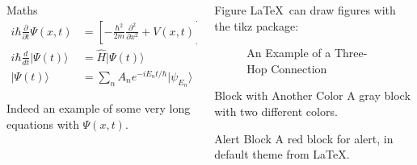 \documentclass{purdue-poster}
\begin{document}
\begin{frame}{}
\begin{columns}[c]
\begin{column}{.48\linewidth}
\begin{block}{Maths}
        \begin{align}
        i\hbar {\frac {\partial }{\partial t}}\Psi (x,t)&=\left[-{\frac {\hbar ^{2}}{2m}}{\frac {\partial ^{2}}{\partial x^{2}}}+V(x,t)\right]\Psi (x,t) \\
        i\hbar {\frac {d}{dt}}\vert \Psi (t)\rangle &={\hat {H}}\vert \Psi (t)\rangle \\ 
        |\Psi (t)\rangle &=\sum _{n}A_{n}e^{{-iE_{n}t}/\hbar }|\psi _{E_{n}}\rangle
        \end{align}
        
        Indeed an example of some very long equations with $\Psi (x,t)$.
    \end{block}
    
    \end{column}

    \begin{column}{.48\linewidth}
    
    \begin{block}{Figure}
        \LaTeX\ can draw figures with the tikz package:
        \begin{figure}[h]
        \centering
        \caption{An Example of a Three-Hop Connection}
        \label{fig:three-hop}
        \end{figure}
    \end{block}

    \begin{exampleblock}{Block with Another Color}
    A gray block with two different colors.
    \end{exampleblock}

    \begin{alertblock}{Alert Block}
    A red block for alert, in default theme from \LaTeX.


\end{alertblock}
\end{column}
\end{columns}
\end{frame}
\end{document}
